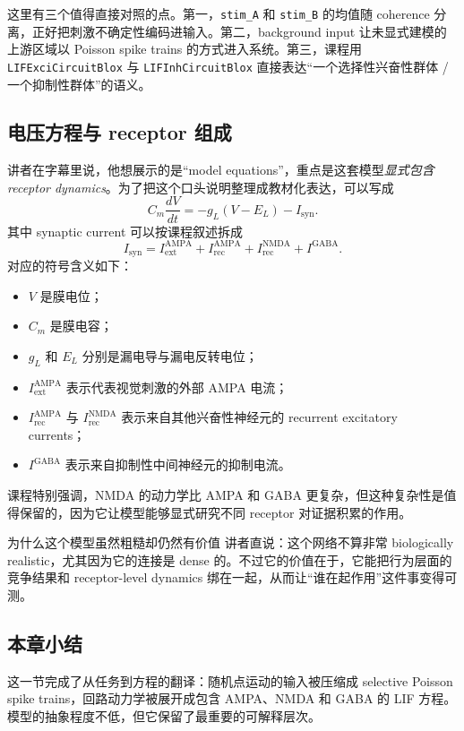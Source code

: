\documentclass[a4paper]{article}
\begin{document}
这里有三个值得直接对照的点。第一，\texttt{stim\_A} 和 \texttt{stim\_B} 的均值随 coherence 分离，正好把刺激不确定性编码进输入。第二，background input 让未显式建模的上游区域以 Poisson spike trains 的方式进入系统。第三，课程用 \texttt{LIFExciCircuitBlox} 与 \texttt{LIFInhCircuitBlox} 直接表达“一个选择性兴奋性群体 / 一个抑制性群体”的语义。

\subsection{电压方程与 receptor 组成}
讲者在字幕里说，他想展示的是“model equations”，重点是这套模型\emph{显式包含 receptor dynamics}。为了把这个口头说明整理成教材化表达，可以写成
\begin{equation}
C_m \frac{dV}{dt} = -g_L(V - E_L) - I_{\mathrm{syn}}.
\end{equation}
其中 synaptic current 可以按课程叙述拆成
\begin{equation}
I_{\mathrm{syn}} =
I_{\mathrm{ext}}^{\mathrm{AMPA}}
+
I_{\mathrm{rec}}^{\mathrm{AMPA}}
+
I_{\mathrm{rec}}^{\mathrm{NMDA}}
+
I^{\mathrm{GABA}}.
\end{equation}
对应的符号含义如下：
\begin{itemize}
    \item $V$ 是膜电位；
    \item $C_m$ 是膜电容；
    \item $g_L$ 和 $E_L$ 分别是漏电导与漏电反转电位；
    \item $I_{\mathrm{ext}}^{\mathrm{AMPA}}$ 表示代表视觉刺激的外部 AMPA 电流；
    \item $I_{\mathrm{rec}}^{\mathrm{AMPA}}$ 与 $I_{\mathrm{rec}}^{\mathrm{NMDA}}$ 表示来自其他兴奋性神经元的 recurrent excitatory currents；
    \item $I^{\mathrm{GABA}}$ 表示来自抑制性中间神经元的抑制电流。
\end{itemize}
课程特别强调，NMDA 的动力学比 AMPA 和 GABA 更复杂，但这种复杂性是值得保留的，因为它让模型能够显式研究不同 receptor 对证据积累的作用。

\begin{warningbox}{为什么这个模型虽然粗糙却仍然有价值}
讲者直说：这个网络不算非常 biologically realistic，尤其因为它的连接是 dense 的。不过它的价值在于，它能把行为层面的竞争结果和 receptor-level dynamics 绑在一起，从而让“谁在起作用”这件事变得可测。
\end{warningbox}

\subsection{本章小结}
这一节完成了从任务到方程的翻译：随机点运动的输入被压缩成 selective Poisson spike trains，回路动力学被展开成包含 AMPA、NMDA 和 GABA 的 LIF 方程。模型的抽象程度不低，但它保留了最重要的可解释层次。
\end{document}

